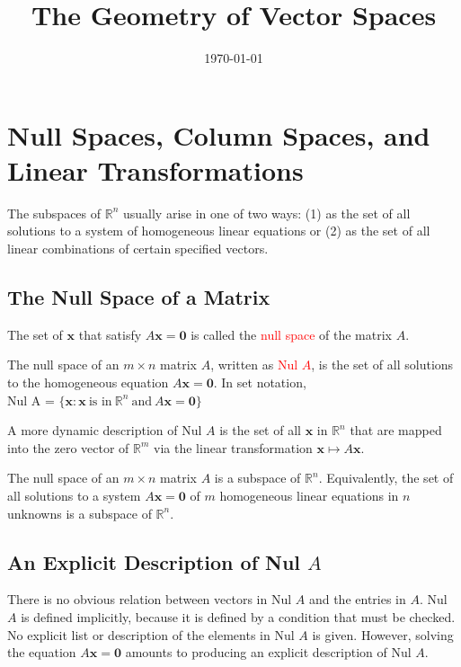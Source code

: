 \documentclass[12pt,a4paper]{article}
\title{The Geometry of Vector Spaces}
\author{}
\date{\today}
\renewcommand{\vec}[1]{\boldsymbol{#1}}
\begin{document}
\maketitle





\section{Null Spaces, Column Spaces, and Linear Transformations}
The subspaces of $\mathbb{R}^n$ usually arise in one of two ways: (1) as the set of all solutions to a system of homogeneous linear equations or (2) as the set of all linear combinations of certain specified vectors.



\subsection{The Null Space of a Matrix}
The set of $\vec{x}$ that satisfy $A \vec{x} = \vec{0}$ is called the \textcolor{red}{null space} of the matrix $A$.

\begin{tcolorbox}[colback=green!5,colframe=green!40!black,title= Definition]
The null space of an $m\times n$ matrix $A$, written as \textcolor{red}{Nul $A$}, is the set of all solutions to the homogeneous equation $A \vec{x} = \vec{0}$. In set notation, \\
Nul A = $\{\vec{x} : \vec{x} ~\text{is in} ~\mathbb{R}^n ~\text{and} ~A \vec{x} = \vec{0}\}$
\end{tcolorbox}
A more dynamic description of Nul $A$ is the set of all $\vec{x}$ in $\mathbb{R}^n$ that are mapped into the zero vector of $\mathbb{R}^m$ via the linear transformation $\vec{x} \mapsto A\vec{x}$. 

\begin{tcolorbox}[colback=green!5,colframe=green!40!black,title= Theorem]
The null space of an $m\times n$ matrix $A$ is a subspace of $\mathbb{R}^n$. Equivalently, the set of all solutions to a system $A\vec{x} = \vec{0}$ of $m$ homogeneous linear equations in $n$ unknowns is a subspace of $\mathbb{R}^n$.
\end{tcolorbox}

\subsection{An Explicit Description of Nul $A$}
There is no obvious relation between vectors in Nul $A$ and the entries in $A$. Nul $A$ is defined implicitly, because it is defined by a condition that must be checked. No explicit list or description of the elements in Nul $A$ is given. However, solving
the equation $A \vec{x} = \vec{0}$ amounts to producing an explicit description of Nul $A$.
\end{document}
